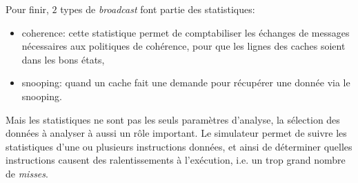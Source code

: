 Pour finir, $2$ types de \emph{broadcast} font partie des statistiques:
\begin{itemize}
\item coherence: cette statistique permet de comptabiliser les échanges de messages nécessaires aux politiques de cohérence, pour que les lignes des caches soient dans les bons états,
\item snooping: quand un cache fait une demande pour récupérer une donnée via le snooping. \\
\end{itemize}


Mais les statistiques ne sont pas les seuls paramètres d'analyse, la sélection des données à analyser à aussi un rôle important. Le simulateur permet de suivre les statistiques d'une ou plusieurs instructions données, et ainsi de déterminer quelles instructions causent des ralentissements à l'exécution, i.e. un trop grand nombre de \emph{misses}.


